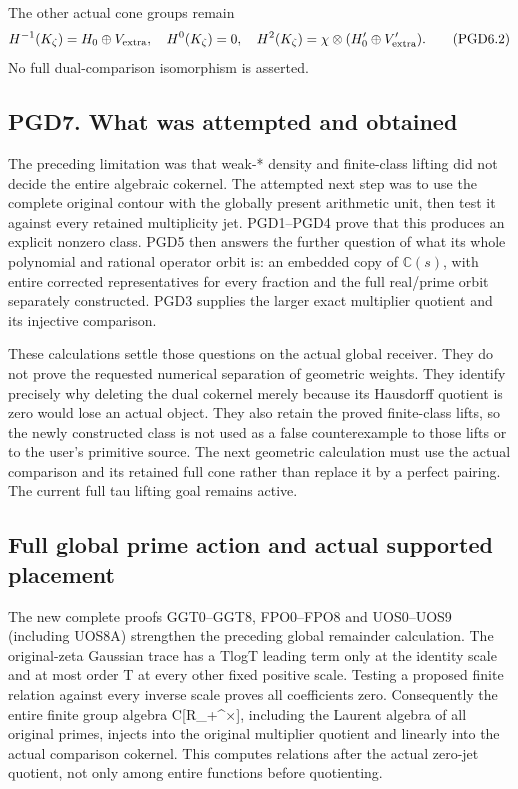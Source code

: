 The other actual cone groups remain \[
H^{-1}(K_\zeta)=H_0\oplus V_{\rm extra},\quad
H^0(K_\zeta)=0,\quad
H^2(K_\zeta)=\chi\otimes(H_0'\oplus V_{\rm extra}').
\tag{PGD6.2}
\] No full dual-comparison isomorphism is asserted.

\subsection{PGD7. What was attempted and
obtained}\label{pgd7.-what-was-attempted-and-obtained}

The preceding limitation was that weak-* density and finite-class
lifting did not decide the entire algebraic cokernel. The attempted next
step was to use the complete original contour with the globally present
arithmetic unit, then test it against every retained multiplicity jet.
PGD1--PGD4 prove that this produces an explicit nonzero class. PGD5 then
answers the further question of what its whole polynomial and rational
operator orbit is: an embedded copy of \(\mathbb C(s)\), with entire
corrected representatives for every fraction and the full real/prime
orbit separately constructed. PGD3 supplies the larger exact multiplier
quotient and its injective comparison.

These calculations settle those questions on the actual global receiver.
They do not prove the requested numerical separation of geometric
weights. They identify precisely why deleting the dual cokernel merely
because its Hausdorff quotient is zero would lose an actual object. They
also retain the proved finite-class lifts, so the newly constructed
class is not used as a false counterexample to those lifts or to the
user's primitive source. The next geometric calculation must use the
actual comparison and its retained full cone rather than replace it by a
perfect pairing. The current full tau lifting goal remains active.

\subsection{Full global prime action and actual supported
placement}\label{full-global-prime-action-and-actual-supported-placement-occurrence-2}

The new complete proofs GGT0--GGT8, FPO0--FPO8 and UOS0--UOS9 (including
UOS8A) strengthen the preceding global remainder calculation. The
original-zeta Gaussian trace has a TlogT leading term only at the
identity scale and at most order T at every other fixed positive scale.
Testing a proposed finite relation against every inverse scale proves
all coefficients zero. Consequently the entire finite group algebra
C{[}R\_+\^{}×{]}, including the Laurent algebra of all original primes,
injects into the original multiplier quotient and linearly into the
actual comparison cokernel. This computes relations after the actual
zero-jet quotient, not only among entire functions before quotienting.

